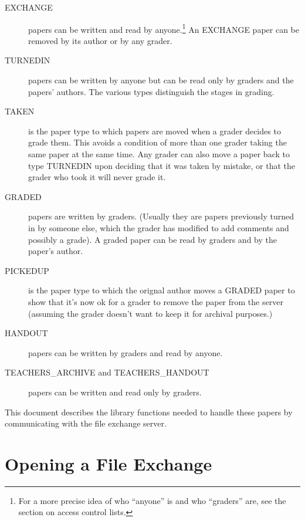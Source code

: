 \begin{description}

\item [EXCHANGE] papers can be written and read by
anyone.\footnote{For a more precise idea of who ``anyone'' is and who
``graders'' are, see the section on access control lists.}  An EXCHANGE
paper can be removed by its author or by any grader.

\item [TURNEDIN] papers can be written
by anyone but can be read only by graders and the papers' authors.  The
various types distinguish the stages in grading.

\item [TAKEN] is the paper type to which papers are moved when a grader
decides to grade them.  This avoids a condition of more than one grader
taking the same paper at the same time.  Any grader can also move a
paper back to type TURNEDIN upon deciding that it was taken by mistake,
or that the grader who took it will never grade it.

\item [GRADED] papers are written by graders.  (Usually they are papers
previously turned in by someone else, which the grader has modified to
add comments and possibly a grade).  A graded paper can be read by
graders and by the paper's author.

\item [PICKEDUP] is the paper type to which the orignal author moves a
GRADED paper to show that it's now ok for a grader to remove the paper
from the server (assuming the grader doesn't want to keep it for
archival purposes.)

\item [HANDOUT] papers can be written by graders and read by anyone.

\item [TEACHERS\_ARCHIVE and TEACHERS\_HANDOUT] papers can be written
and read only by graders.

\end{description}

This document describes the library functions needed to handle these
papers by communicating with the file exchange server.

\pagebreak[3]

\section{Opening a File Exchange}


